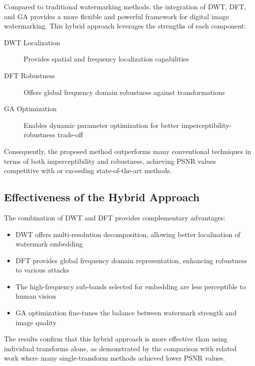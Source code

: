 Compared to traditional watermarking methods, the integration of DWT, DFT, and GA provides a more flexible and powerful framework for digital image watermarking. This hybrid approach leverages the strengths of each component:

\begin{description}
    \item[DWT Localization] Provides spatial and frequency localization capabilities
    \item[DFT Robustness] Offers global frequency domain robustness against transformations
    \item[GA Optimization] Enables dynamic parameter optimization for better imperceptibility-robustness trade-off
\end{description}

Consequently, the proposed method outperforms many conventional techniques in terms of both imperceptibility and robustness, achieving PSNR values competitive with or exceeding state-of-the-art methods.

\subsection{Effectiveness of the Hybrid Approach}

The combination of DWT and DFT provides complementary advantages:

\begin{itemize}
    \item DWT offers multi-resolution decomposition, allowing better localization of watermark embedding
    \item DFT provides global frequency domain representation, enhancing robustness to various attacks
    \item The high-frequency sub-bands selected for embedding are less perceptible to human vision
    \item GA optimization fine-tunes the balance between watermark strength and image quality
\end{itemize}

The results confirm that this hybrid approach is more effective than using individual transforms alone, as demonstrated by the comparison with related work where many single-transform methods achieved lower PSNR values.
